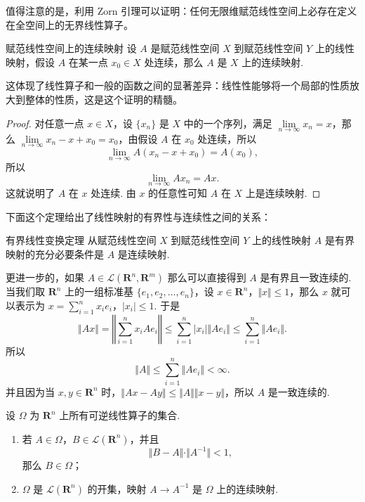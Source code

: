 值得注意的是，利用 Zorn 引理可以证明：任何无限维赋范线性空间上必存在定义在全空间上的无界线性算子。

\begin{theorem}{赋范线性空间上的连续映射}{}
    设 $A$ 是赋范线性空间 $X$ 到赋范线性空间 $Y$ 上的线性映射，假设 $A$ 在某一点 $x_0\in X$ 处连续，那么 $A$ 是 $X$ 上的连续映射.
\end{theorem}

这体现了线性算子和一般的函数之间的显著差异：线性性能够将一个局部的性质放大到整体的性质，这是这个证明的精髓。

\begin{proof}
    对任意一点 $x\in X$，设 $\{x_n\}$ 是 $X$ 中的一个序列，满足 $\lim\limits_{n\to\infty}x_n = x$，那么 $\lim\limits_{n\to\infty}x_n - x + x_0 = x_0$，由假设 $A$ 在 $x_0$ 处连续，所以 \[\lim\limits_{n\to\infty}A(x_n - x + x_0) = A(x_0),\]
    所以 \[\lim\limits_{n\to\infty}Ax_n = Ax.\]
    这就说明了 $A$ 在 $x$ 处连续. 由 $x$ 的任意性可知 $A$ 在 $X$ 上是连续映射.
\end{proof}

下面这个定理给出了线性映射的有界性与连续性之间的关系：

\begin{theorem}{有界线性变换定理}{}
    从赋范线性空间 $X$ 到赋范线性空间 $Y$ 上的线性映射 $A$ 是有界映射的充分必要条件是 $A$ 是连续映射.
\end{theorem}

更进一步的，如果 $A\in \mathcal{L}(\mathbf{R}^n, \mathbf{R}^m)$ 那么可以直接得到 $A$ 是有界且一致连续的. 当我们取 $\mathbf{R}^n$ 上的一组标准基 $\{e_1, e_2, \ldots, e_n\}$，设 $x\in \mathbf{R}^n$，$\Vert x\Vert \leqslant 1$，那么 $x$ 就可以表示为 $x = \displaystyle\sum_{i=1}^{n} x_ie_i$，$\vert x_i \vert \leqslant 1$. 于是
\[\Vert Ax\Vert = \left\Vert \sum_{i=1}^{n} x_iAe_i\right\Vert \leqslant \sum_{i=1}^{n}\vert x_i\vert \Vert Ae_i\Vert \leqslant \sum_{i=1}^{n}\Vert Ae_i\Vert.\]
所以\[\Vert A\Vert \leqslant \sum_{i=1}^{n}\Vert Ae_i\Vert < \infty.\]
并且因为当 $x, y\in \mathbf{R}^n$ 时，$\Vert Ax - Ay \Vert \leqslant \Vert A\Vert\Vert x-y\Vert$，所以 $A$ 是一致连续的.

\begin{theorem}{}{}
    设 $\Omega$ 为 $\mathbf{R}^n$ 上所有可逆线性算子的集合.
    \begin{enumerate}
        \item 若 $A\in \Omega$，$B\in \mathcal{L}(\mathbf{R}^n)$，并且 \[\Vert B-A\Vert\cdot\Vert A^{-1}\Vert < 1,\]那么 $B\in \Omega$；
        \item $\Omega$ 是 $\mathcal{L}(\mathbf{R}^n)$ 的开集，映射 $A\to A^{-1}$ 是 $\Omega$ 上的连续映射.
    \end{enumerate}
\end{theorem}

